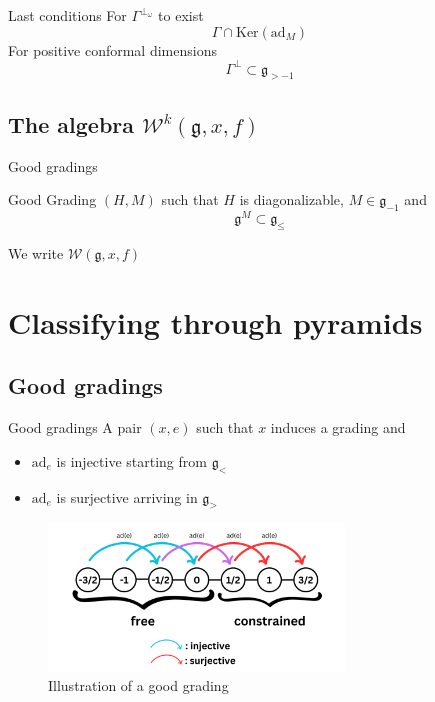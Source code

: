 \documentclass{beamer}
\begin{document}
\begin{frame}{Last conditions} \huge
    For $\Gamma^{\perp_\omega}$ to exist
    \begin{equation}
        \Gamma \cap \text{Ker}(\text{ad}_M)
    \end{equation}
    For positive conformal dimensions
    \begin{equation}
        \Gamma ^\perp \subset \mathfrak{g}_{>-1}
    \end{equation}
\end{frame}

\subsection{The algebra $\mathcal{W}^k(\mathfrak{g}, x, f)$}


\begin{frame}{Good gradings} \LARGE
    \begin{alertblock}{Good Grading}
        $(H, M)$ such that $H$ is diagonalizable, $M \in \mathfrak{g}_{-1}$ and 
        \begin{equation}
            \mathfrak{g}^M \subset \mathfrak{g}_{\leq}
        \end{equation}
    \end{alertblock}
    We write $\mathcal{W}(\mathfrak{g}, x, f)$
\end{frame}

\section{Classifying through pyramids}
\subsection{Good gradings}


\begin{frame}{Good gradings}
    A pair $(x, e)$ such that $x$ induces a grading and
    \begin{itemize}
        \item $\text{ad}_e$ is injective starting from $\mathfrak{g}_{<}$
        \item $\text{ad}_e$ is surjective arriving in $\mathfrak{g}_{>}$
    \end{itemize}

    \begin{figure}
        \centering
        \includegraphics[width=0.7\textwidth]{goodgrading}
        \caption{Illustration of a good grading}
    \end{figure}
\end{frame}
\end{document}
